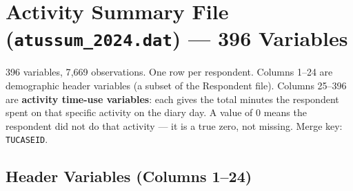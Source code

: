 \documentclass[11pt, a4paper]{article}
\begin{document}
\newpage
\section{Activity Summary File (\texttt{atussum\_2024.dat}) --- 396 Variables}

\begin{tcolorbox}[notebox]
396 variables, 7{,}669 observations. One row per respondent.
Columns 1--24 are demographic header variables (a subset of the Respondent
file). Columns 25--396 are \textbf{activity time-use variables}: each gives
the total minutes the respondent spent on that specific activity on the diary
day. A value of 0 means the respondent did not do that activity --- it is a
true zero, not missing. Merge key: \texttt{TUCASEID}.
\end{tcolorbox}

\subsection{Header Variables (Columns 1--24)}
\end{document}
